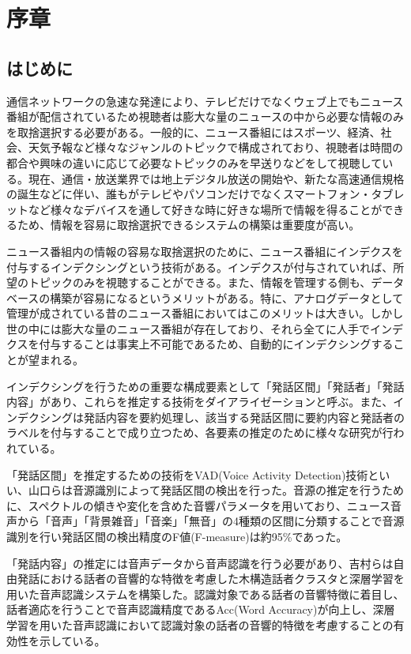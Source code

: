 \chapter{序章}
\section{はじめに}
通信ネットワークの急速な発達により、テレビだけでなくウェブ上でもニュース番組が配信されているため視聴者は膨大な量のニュースの中から必要な情報のみを取捨選択する必要がある。一般的に、ニュース番組にはスポーツ、経済、社会、天気予報など様々なジャンルのトピックで構成されており、視聴者は時間の都合や興味の違いに応じて必要なトピックのみを早送りなどをして視聴している。現在、通信・放送業界では地上デジタル放送の開始や、新たな高速通信規格の誕生などに伴い、誰もがテレビやパソコンだけでなくスマートフォン・タブレットなど様々なデバイスを通して好きな時に好きな場所で情報を得ることができるため、情報を容易に取捨選択できるシステムの構築は重要度が高い。\par

ニュース番組内の情報の容易な取捨選択のために、ニュース番組にインデクスを付与するインデクシングという技術がある。インデクスが付与されていれば、所望のトピックのみを視聴することができる。また、情報を管理する側も、データベースの構築が容易になるというメリットがある。特に、アナログデータとして管理が成されている昔のニュース番組においてはこのメリットは大きい。しかし世の中には膨大な量のニュース番組が存在しており、それら全てに人手でインデクスを付与することは事実上不可能であるため、自動的にインデクシングすることが望まれる。\par

インデクシングを行うための重要な構成要素として「発話区間」「発話者」「発話内容」があり、これらを推定する技術をダイアライゼーションと呼ぶ。また、インデクシングは発話内容を要約処理し、該当する発話区間に要約内容と発話者のラベルを付与することで成り立つため、各要素の推定のために様々な研究が行われている。\par

「発話区間」を推定するための技術をVAD(Voice Activity Detection)技術\cite{vad}といい、山口ら\cite{yamaguchi_indexing}は音源識別によって発話区間の検出を行った。音源の推定を行うために、スペクトルの傾きや変化を含めた音響パラメータを用いており、ニュース音声から「音声」「背景雑音」「音楽」「無音」の4種類の区間に分類することで音源識別を行い発話区間の検出精度のF値(F-measure)は約95\%であった。\par

「発話内容」の推定には音声データから音声認識を行う必要があり、吉村ら\cite{yoshimura_clustering}は自由発話における話者の音響的な特徴を考慮した木構造話者クラスタと深層学習を用いた音声認識システムを構築した。認識対象である話者の音響特徴に着目し、話者適応を行うことで音声認識精度であるAcc(Word Accuracy)が向上し、深層学習を用いた音声認識において認識対象の話者の音響的特徴を考慮することの有効性を示している。\par

